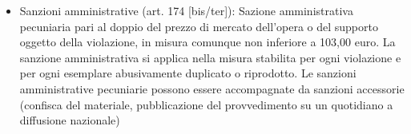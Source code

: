 \begin{itemize}
\begin{itemize}
    \end{itemize}
    \item Sanzioni amministrative (art. 174 [bis/ter]): Sazione amministrativa pecuniaria pari al doppio
    del prezzo di mercato dell'opera o del supporto oggetto della violazione, in misura comunque non inferiore a 103,00 euro.\newline
    La sanzione amministrativa si applica nella misura stabilita per ogni violazione e per ogni esemplare abusivamente duplicato
    o riprodotto.\newline
    Le sanzioni amministrative pecuniarie possono essere accompagnate da sanzioni accessorie (confisca del materiale,
    pubblicazione del provvedimento su un quotidiano a diffusione nazionale)
\end{itemize}
